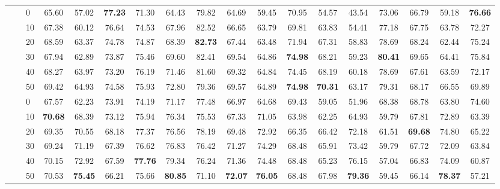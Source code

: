 \begin{table*}[!h]
{\begin{tabular}{lllccc|ccc|ccc|ccc|ccc}
\hline
\arrayrulecolor{gray}\cline{2-18}\arrayrulecolor{black}
\textbf{\multirow{12}{*}{Aspect Term}} & \textbf{\multirow{6}{*}{-}} & 0 & 65.60 & 57.02 & \textbf{77.23} & 71.30 & 64.43 & 79.82 & 64.69 & 59.45 & 70.95 & 54.57 & 43.54 & 73.06 & 66.79 & 59.18 & \textbf{76.66} \\ 
 \textbf{} & \textbf{} & 10 & 67.38 & 60.12 & 76.64 & 74.53 & 67.96 & 82.52 & 66.65 & 63.79 & 69.81 & 63.83 & 54.41 & 77.18 & 67.75 & 63.78 & 72.27 \\ 
 \textbf{} & \textbf{} & 20 & 68.59 & 63.37 & 74.78 & 74.87 & 68.39 & \textbf{82.73} & 67.44 & 63.48 & 71.94 & 67.31 & 58.83 & 78.69 & 68.24 & 62.44 & 75.24 \\ 
 \textbf{} & \textbf{} & 30 & 67.94 & 62.89 & 73.87 & 75.46 & 69.60 & 82.41 & 69.54 & 64.86 & \textbf{74.98} & 68.21 & 59.23 & \textbf{80.41} & 69.65 & 64.41 & 75.84 \\ 
 \textbf{} & \textbf{} & 40 & 68.27 & 63.97 & 73.20 & 76.19 & 71.46 & 81.60 & 69.32 & 64.84 & 74.45 & 68.19 & 60.18 & 78.69 & 67.61 & 63.59 & 72.17 \\ 
 \textbf{} & \textbf{} & 50 & 69.42 & 64.93 & 74.58 & 75.93 & 72.80 & 79.36 & 69.57 & 64.89 & \textbf{74.98} & \textbf{70.31} & 63.17 & 79.31 & 68.17 & 66.55 & 69.89 \\ 
 \arrayrulecolor{gray}\cline{2-18}\arrayrulecolor{black}
\textbf{} & \textbf{\multirow{6}{*}{SC}} & 0 & 67.57 & 62.23 & 73.91 & 74.19 & 71.17 & 77.48 & 66.97 & 64.68 & 69.43 & 59.05 & 51.96 & 68.38 & 68.78 & 63.80 & 74.60 \\ 
 \textbf{} & \textbf{} & 10 & \textbf{70.68} & 68.39 & 73.12 & 75.94 & 76.34 & 75.53 & 67.33 & 71.05 & 63.98 & 62.25 & 64.93 & 59.79 & 67.81 & 72.89 & 63.39 \\ 
 \textbf{} & \textbf{} & 20 & 69.35 & 70.55 & 68.18 & 77.37 & 76.56 & 78.19 & 69.48 & 72.92 & 66.35 & 66.42 & 72.18 & 61.51 & \textbf{69.68} & 74.80 & 65.22 \\ 
 \textbf{} & \textbf{} & 30 & 69.24 & 71.19 & 67.39 & 76.62 & 76.83 & 76.42 & 71.27 & 74.29 & 68.48 & 65.91 & 73.42 & 59.79 & 67.72 & 72.09 & 63.84 \\ 
 \textbf{} & \textbf{} & 40 & 70.15 & 72.92 & 67.59 & \textbf{77.76} & 79.34 & 76.24 & 71.36 & 74.48 & 68.48 & 65.23 & 76.15 & 57.04 & 66.83 & 74.09 & 60.87 \\ 
 \textbf{} & \textbf{} & 50 & 70.53 & \textbf{75.45} & 66.21 & 75.66 & \textbf{80.85} & 71.10 & \textbf{72.07} & \textbf{76.05} & 68.48 & 67.98 & \textbf{79.36} & 59.45 & 66.14 & \textbf{78.37} & 57.21 \\ 

\end{tabular}}
\end{table*}

